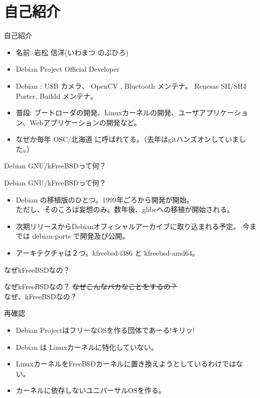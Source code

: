 \section{自己紹介}
\begin{frame}{自己紹介}
 \begin{itemize}
  \item 名前: 岩松 信洋(いわまつ のぶひろ)
  \item Debian Project Official Developer
  \item Debian : USB カメラ、 OpenCV , Bluetooth メンテナ。
  Renesas SH/SH4 Porter, Buildd メンテナ。
  \item 普段: ブートローダの開発、Linuxカーネルの開発、ユーザアプリケーション、Webアプリケーションの開発など。
  \item なぜか毎年 OSC/北海道 に呼ばれてる。（去年はgitハンズオンしていました。）
 \end{itemize}
\end{frame}

\begin{frame}{Debian GNU/kFreeBSDって何？}

\end{frame}

\begin{frame}{Debian GNU/kFreeBSDって何？}
  \begin{itemize}
    \item<1-> Debian の移植版のひとつ。1999年ごろから開発が開始。\\

ただし、そのころは妄想のみ。数年後、glibcへの移植が開始される。
    \item<2-> 次期リリースからDebianオフィシャルアーカイブに取り込まれる予定。
          今までは debian-ports で開発及び公開。
    \item<3-> アーキテクチャは２つ。kfreebsd-i386 と kfreebsd-amd64。
  \end{itemize}
\end{frame}

\begin{frame}{なぜkFreeBSDなの？}

\end{frame}

\begin{frame}{なぜkFreeBSDなの？}
\sout{なぜこんなバカなことをするの？}\\
なぜ、kFreeBSDなの？
\end{frame}

\begin{frame}{再確認}
\begin{itemize}
\item<1-> Debian ProjectはフリーなOSを作る団体であーる!キリッ!
\item<2-> Debian は Linuxカーネルに特化していない。
\item<3-> LinuxカーネルをFreeBSDカーネルに置き換えようとしているわけではない。
\item<4-> カーネルに依存しないユニバーサルOSを作る。
\end{itemize}
\end{frame}

